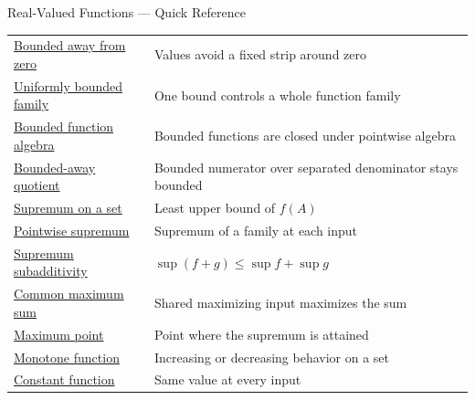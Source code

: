 \begin{toolkitbox}{Real-Valued Functions --- Quick Reference}
\begin{tabular}{l l}
\hyperref[def:function-bounded-away-from-zero]{Bounded away from zero} & Values avoid a fixed strip around zero \\
\hyperref[def:uniformly-bounded-family]{Uniformly bounded family} & One bound controls a whole function family \\
\hyperref[thm:bounded-function-algebra-closure]{Bounded function algebra} & Bounded functions are closed under pointwise algebra \\
\hyperref[thm:bounded-away-quotient]{Bounded-away quotient} & Bounded numerator over separated denominator stays bounded \\
\hyperref[def:function-supremum-on-set]{Supremum on a set} & Least upper bound of \(f(A)\) \\
\hyperref[def:pointwise-supremum-family]{Pointwise supremum} & Supremum of a family at each input \\
\hyperref[thm:supremum-subadditivity]{Supremum subadditivity} & \(\sup(f+g)\leq \sup f+\sup g\) \\
\hyperref[thm:common-maximum-gives-sum-maximum]{Common maximum sum} & Shared maximizing input maximizes the sum \\
\hyperref[def:function-maximum-point]{Maximum point} & Point where the supremum is attained \\
\hyperref[def:function-monotone]{Monotone function} & Increasing or decreasing behavior on a set \\
\hyperref[def:function-constant]{Constant function} & Same value at every input \\
\bottomrule
\end{tabular}
\end{toolkitbox}


